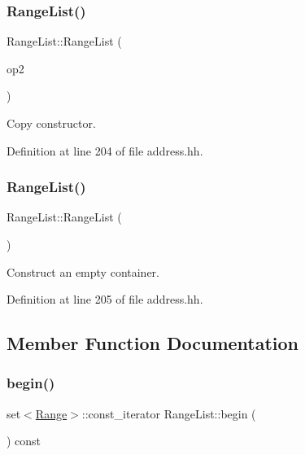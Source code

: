 \subsubsection{\texorpdfstring{RangeList()}{RangeList()}\hspace{0.1cm}{\footnotesize\ttfamily [1/2]}}
{\footnotesize\ttfamily Range\+List\+::\+Range\+List (\begin{DoxyParamCaption}\item[{const \mbox{\hyperlink{class_range_list}{Range\+List}} \&}]{op2 }\end{DoxyParamCaption})\hspace{0.3cm}{\ttfamily [inline]}}



Copy constructor. 



Definition at line 204 of file address.\+hh.

\mbox{\label{class_range_list_a2138ead753fe147949be8b725f1ee89b}} 
\subsubsection{\texorpdfstring{RangeList()}{RangeList()}\hspace{0.1cm}{\footnotesize\ttfamily [2/2]}}
{\footnotesize\ttfamily Range\+List\+::\+Range\+List (\begin{DoxyParamCaption}\item[{void}]{ }\end{DoxyParamCaption})\hspace{0.3cm}{\ttfamily [inline]}}



Construct an empty container. 



Definition at line 205 of file address.\+hh.



\subsection{Member Function Documentation}
\mbox{\label{class_range_list_a890040e91f6bf573706b76a185ab6cbe}} 
\subsubsection{\texorpdfstring{begin()}{begin()}}
{\footnotesize\ttfamily set$<$\mbox{\hyperlink{class_range}{Range}}$>$\+::const\+\_\+iterator Range\+List\+::begin (\begin{DoxyParamCaption}\item[{void}]{ }\end{DoxyParamCaption}) const\hspace{0.3cm}{\ttfamily [inline]}}



